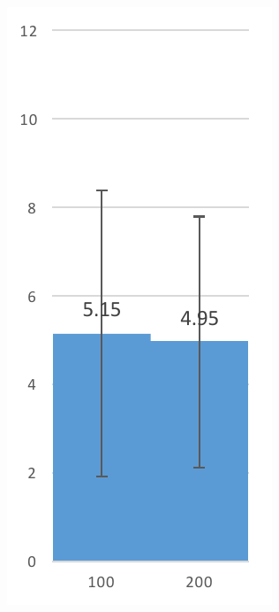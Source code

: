 \documentclass[journal]{vgtc}                %
\begin{document}
\begin{figure}
    \centering
    \begin{subfigure}[b]{0.13\textwidth}
        \includegraphics[width=\textwidth]{ble-high-tp}

\end{subfigure}
\end{figure}
\end{document}
